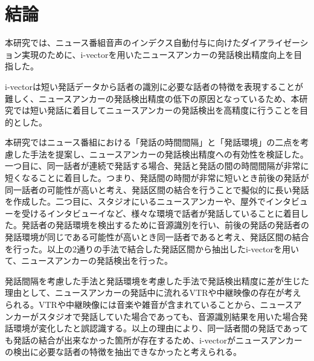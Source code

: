\chapter{結論}
本研究では、ニュース番組音声のインデクス自動付与に向けたダイアライゼーション実現のために、i-vectorを用いたニュースアンカーの発話検出精度向上を目指した。\par

i-vectorは短い発話データから話者の識別に必要な話者の特徴を表現することが難しく、ニュースアンカーの発話検出精度の低下の原因となっているため、本研究では短い発話に着目してニュースアンカーの発話検出を高精度に行うことを目的とした。\par

本研究ではニュース番組における「発話の時間間隔」と「発話環境」の二点を考慮した手法を提案し、ニュースアンカーの発話検出精度への有効性を検証した。一つ目に、同一話者が連続で発話する場合、発話と発話の間の時間間隔が非常に短くなることに着目した。つまり、発話間の時間が非常に短いとき前後の発話が同一話者の可能性が高いと考え、発話区間の結合を行うことで擬似的に長い発話を作成した。二つ目に、スタジオにいるニュースアンカーや、屋外でインタビューを受けるインタビューイなど、様々な環境で話者が発話していることに着目した。発話者の発話環境を検出するために音源識別を行い、前後の発話の発話者の発話環境が同じである可能性が高いとき同一話者であると考え、発話区間の結合を行った。以上の2通りの手法で結合した発話区間から抽出したi-vectorを用いて、ニュースアンカーの発話検出を行った。\par

\begin{comment}
ニュースアンカーの検出精度の評価指標であるF値を従来手法と比較したところ、発話の時間間隔を考慮した手法が6.5\%、発話環境を考慮した手法が2.3\%の検出精度向上が確認された。また、両方の手法を組み合わせて実験を行ったところ、従来手法と比較して4.7\%の検出精度の向上が確認されたが、発話の時間間隔のみを考慮した場合と比較すると精度が1.8\%低下した。またいずれの手法も、ニュースアンカーの発話数が少ないニュース番組の発話検出精度のP値がニュースアンカーの発話数が多いニュース番組と比較して、10\%程度低下した。\par
\end{comment}

発話間隔を考慮した手法と発話環境を考慮した手法で発話検出精度に差が生じた理由として、ニュースアンカーの発話中に流れるVTRや中継映像の存在が考えられる。VTRや中継映像には音楽や雑音が含まれていることから、ニュースアンカーがスタジオで発話していた場合であっても、音源識別結果を用いた場合発話環境が変化したと誤認識する。以上の理由により、同一話者間の発話であっても発話の結合が出来なかった箇所が存在するため、i-vectorがニュースアンカーの検出に必要な話者の特徴を抽出できなかったと考えられる。\par

